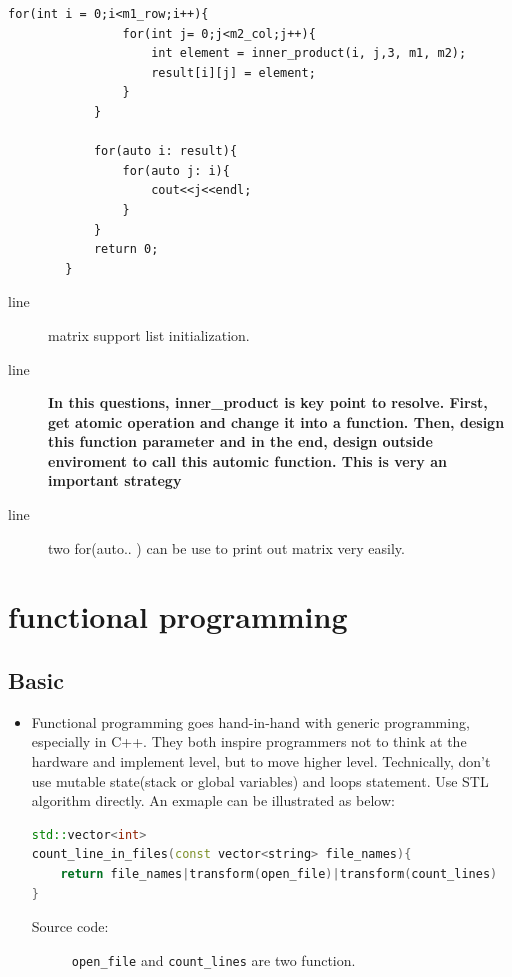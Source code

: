 \documentclass[a4paper,11pt,twoside]{book}
\begin{document}
\begin{itemize}
\begin{lstlisting}[numbers=none]
			for(int i = 0;i<m1_row;i++){
				for(int j= 0;j<m2_col;j++){
					int element = inner_product(i, j,3, m1, m2); 
					result[i][j] = element;
				}
			}
			
			for(auto i: result){
				for(auto j: i){
					cout<<j<<endl;
				}
			}
			return 0;
		}
	\end{lstlisting}
	
	\begin{description}
		\item[line ] matrix support list initialization.
		
		\item[line ] \textbf{In this questions, inner\_product is key point to resolve. First, get atomic operation and change it into a function. Then, design this function parameter and in the end, design outside enviroment to call this automic function. This is very an important strategy} 
		
		\item[line ] two for(auto.. ) can be use to print out matrix very easily.
	\end{description}
	
\end{itemize}


\chapter{functional programming}
\section{Basic}
\begin{itemize}
	\item Functional programming goes hand-in-hand with generic programming, especially in C++. They both inspire programmers not to think at the hardware and implement level, but to move higher level. Technically, don't use mutable state(stack or global variables) and loops statement. Use STL algorithm directly. An exmaple can be illustrated as below:
	
	
\begin{lstlisting}[frame=single, language=c++]
std::vector<int>
count_line_in_files(const vector<string> file_names){
	return file_names|transform(open_file)|transform(count_lines)
}
\end{lstlisting}	

\begin{description}
	\item[Source code:] \texttt{open\_file} and \texttt{count\_lines} are two function. 
\end{description}
	
\end{itemize}
\end{document}
